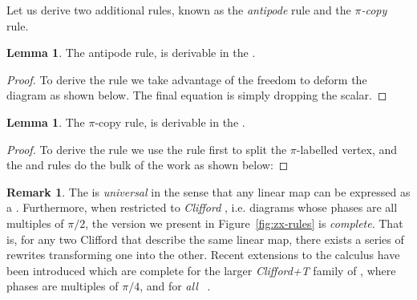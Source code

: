 \documentclass[a4paper,onecolumn,superscriptaddress,11pt,accepted=2020-04-27]{quantumarticle}
\theoremstyle{definition}
\newtheorem{lemma}[theorem]{Lemma}
\newtheorem{remark}[theorem]{Remark}
\begin{document}
Let us derive two additional rules, known as the
\emph{antipode} rule and the \emph{$\pi$-copy} rule.

\begin{lemma}\label{lem:hopf-law}
  The antipode rule, 
  is derivable in the \zxcalculus.
  \begin{proof}
    To derive the \HopfRule rule we take advantage of the freedom to
    deform the diagram as shown below.
    The final equation is simply dropping the scalar.
  \end{proof}
\end{lemma}

\begin{lemma}\label{lem:pi-state-copy}
  The $\pi$-copy rule,
   is derivable in the \zxcalculus.
  \begin{proof}
    To derive the \PiCopyRule rule we use the \SpiderRule rule first
    to split the $\pi$-labelled vertex, and the \PiRule and \CopyRule
    rules do the bulk of the work as shown below:
  \end{proof}  
\end{lemma}


\begin{remark}\label{rem:completeness}
  The \zxcalculus is \emph{universal} in the sense that any linear map can be expressed as a \zxdiagram. Furthermore, when restricted to \textit{Clifford \zxdiagrams}, i.e. diagrams whose phases are all multiples of $\pi/2$, the version we present in Figure~\ref{fig:zx-rules} is \emph{complete}. That is, for any two Clifford \zxdiagrams that describe the same linear map, there exists a series of rewrites transforming one into the other. Recent extensions to the calculus have been introduced which are complete for the larger \textit{Clifford+T} family of \zxdiagrams \cite{SimonCompleteness}, where phases are multiples of $\pi/4$, and for \textit{all} \zxdiagrams~\cite{HarnyAmarCompleteness,JPV-universal,euler-zx}.
\end{remark}
\end{document}
